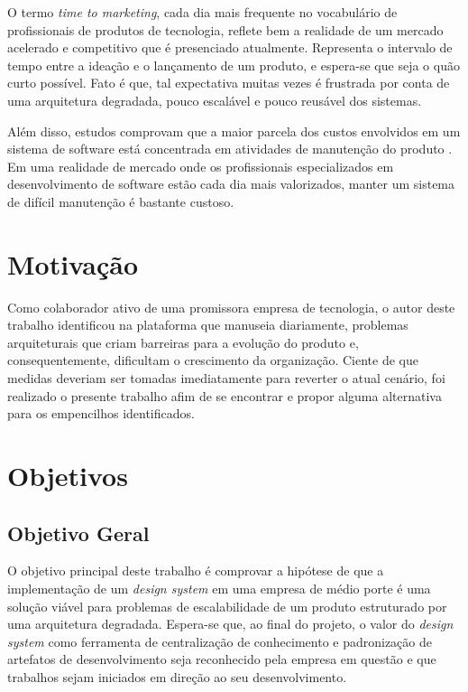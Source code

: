 O termo \textit{time to marketing}, cada dia mais frequente no vocabulário de profissionais de produtos de tecnologia, reflete bem a realidade de um mercado acelerado e competitivo que é presenciado atualmente. Representa o intervalo de tempo entre a ideação e o lançamento de um produto, e espera-se que seja o quão curto possível. Fato é que, tal expectativa muitas vezes é frustrada por conta de uma arquitetura degradada, pouco escalável e pouco reusável dos sistemas.

Além disso, estudos comprovam que a maior parcela dos custos envolvidos em um sistema de software está concentrada em atividades de manutenção do produto \cite{softwareCost}. Em uma realidade de mercado onde os profissionais especializados em desenvolvimento de software estão cada dia mais valorizados, manter um sistema de difícil manutenção é bastante custoso.

\section{Motivação}
\label{sec:motivacao}

Como colaborador ativo de uma promissora empresa de tecnologia, o autor deste trabalho identificou na plataforma que manuseia diariamente, problemas arquiteturais que criam barreiras para a evolução do produto e, consequentemente, dificultam o crescimento da organização. Ciente de que medidas deveriam ser tomadas imediatamente para reverter o atual cenário, foi realizado o presente trabalho afim de se encontrar e propor alguma alternativa para os empencilhos identificados.

\section{Objetivos}
\label{sec:objetivos}

\subsection{Objetivo Geral}

O objetivo principal deste trabalho é comprovar a hipótese de que a implementação de um \textit{design system} em uma empresa de médio porte é uma solução viável para problemas de escalabilidade de um produto estruturado por uma arquitetura degradada. Espera-se que, ao final do projeto, o valor do \textit{design system} como ferramenta de centralização de conhecimento e padronização de artefatos de desenvolvimento seja reconhecido pela empresa em questão e que trabalhos sejam iniciados em direção ao seu desenvolvimento.

